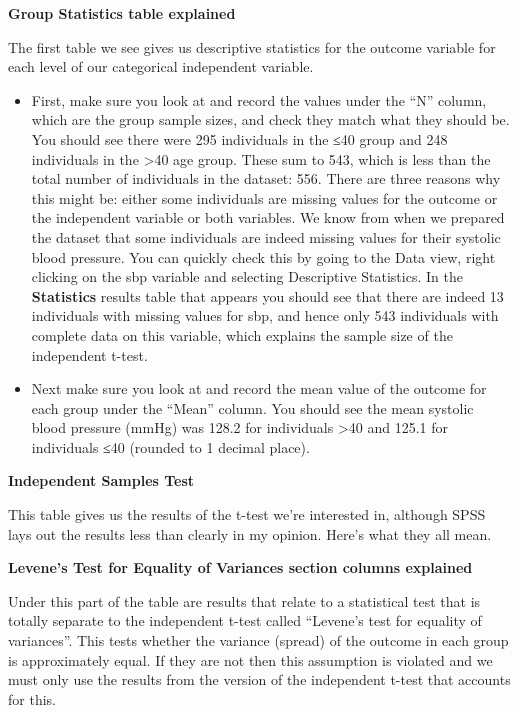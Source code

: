 \documentclass[
]{book}
\begin{document}
\textbf{Group Statistics table explained}

The first table we see gives us descriptive statistics for the outcome variable for each level of our categorical independent variable.

\begin{itemize}
\item
  First, make sure you look at and record the values under the ``N'' column, which are the group sample sizes, and check they match what they should be. You should see there were 295 individuals in the ≤40 group and 248 individuals in the \textgreater40 age group. These sum to 543, which is less than the total number of individuals in the dataset: 556. There are three reasons why this might be: either some individuals are missing values for the outcome or the independent variable or both variables. We know from when we prepared the dataset that some individuals are indeed missing values for their systolic blood pressure. You can quickly check this by going to the Data view, right clicking on the sbp variable and selecting Descriptive Statistics. In the \textbf{Statistics} results table that appears you should see that there are indeed 13 individuals with missing values for sbp, and hence only 543 individuals with complete data on this variable, which explains the sample size of the independent t-test.
\item
  Next make sure you look at and record the mean value of the outcome for each group under the ``Mean'' column. You should see the mean systolic blood pressure (mmHg) was 128.2 for individuals \textgreater40 and 125.1 for individuals ≤40 (rounded to 1 decimal place).
\end{itemize}

\textbf{Independent Samples Test}

This table gives us the results of the t-test we're interested in, although SPSS lays out the results less than clearly in my opinion. Here's what they all mean.

\textbf{Levene's Test for Equality of Variances section columns explained}

Under this part of the table are results that relate to a statistical test that is totally separate to the independent t-test called ``Levene's test for equality of variances''. This tests whether the variance (spread) of the outcome in each group is approximately equal. If they are not then this assumption is violated and we must only use the results from the version of the independent t-test that accounts for this.
\end{document}
